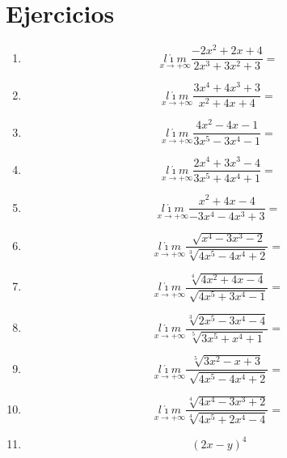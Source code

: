 \documentclass[oneside,spanish,letter]{article}
\begin{document}
\section{Ejercicios}
\begin{enumerate}
 \item $$\underset{x\rightarrow +\infty}{l\acute{\imath}m} \frac{-2x^2+2x+4}{2x^3+3x^2+3}=$$
 \item $$\underset{x\rightarrow +\infty}{l\acute{\imath}m} \frac{3x^4+4x^3+3}{x^2+4x+4}=$$
 \item $$\underset{x\rightarrow +\infty}{l\acute{\imath}m} \frac{4x^2-4x-1}{3x^5-3x^4-1}=$$
 \item $$\underset{x\rightarrow +\infty}{l\acute{\imath}m} \frac{2x^4+3x^3-4}{3x^5+4x^4+1}=$$
 \item $$\underset{x\rightarrow +\infty}{l\acute{\imath}m} \frac{x^2+4x-4}{-3x^4-4x^3+3}=$$
 \item $$\underset{x\rightarrow +\infty}{l\acute{\imath}m} \frac{\sqrt[]{x^4-3x^3-2}}{\sqrt[3]{4x^5-4x^4+2}}=$$
 \item $$\underset{x\rightarrow +\infty}{l\acute{\imath}m} \frac{\sqrt[4]{4x^2+4x-4}}{\sqrt[]{4x^5+3x^4-1}}=$$
 \item $$\underset{x\rightarrow +\infty}{l\acute{\imath}m} \frac{\sqrt[3]{2x^5-3x^4-4}}{\sqrt[5]{3x^5+x^4+1}}=$$
 \item $$\underset{x\rightarrow +\infty}{l\acute{\imath}m} \frac{\sqrt[5]{3x^2-x+3}}{\sqrt[]{4x^5-4x^4+2}}=$$
 \item $$\underset{x\rightarrow +\infty}{l\acute{\imath}m} \frac{\sqrt[4]{4x^4-3x^3+2}}{\sqrt[4]{4x^5+2x^4-4}}=$$
\item $$(2x-y)^4$$
 \end{enumerate}
  \newpage
\end{document}

